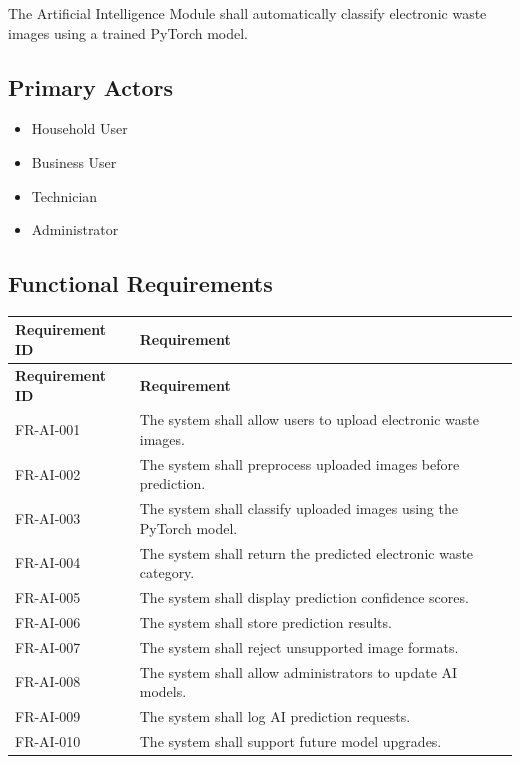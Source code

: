 The Artificial Intelligence Module shall automatically classify
electronic waste images using a trained PyTorch model.

\subsection{Primary Actors}

\begin{itemize}
\item Household User
\item Business User
\item Technician
\item Administrator
\end{itemize}

\subsection{Functional Requirements}

\begin{longtable}{|p{3cm}|p{10.2cm}|}

\hline
\textbf{Requirement ID} &
\textbf{Requirement}\\
\hline
\endfirsthead

\hline
\textbf{Requirement ID} &
\textbf{Requirement}\\
\hline
\endhead

FR-AI-001 &
The system shall allow users to upload electronic waste images.\\
\hline

FR-AI-002 &
The system shall preprocess uploaded images before prediction.\\
\hline

FR-AI-003 &
The system shall classify uploaded images using the PyTorch model.\\
\hline

FR-AI-004 &
The system shall return the predicted electronic waste category.\\
\hline

FR-AI-005 &
The system shall display prediction confidence scores.\\
\hline

FR-AI-006 &
The system shall store prediction results.\\
\hline

FR-AI-007 &
The system shall reject unsupported image formats.\\
\hline

FR-AI-008 &
The system shall allow administrators to update AI models.\\
\hline

FR-AI-009 &
The system shall log AI prediction requests.\\
\hline

FR-AI-010 &
The system shall support future model upgrades.\\
\hline

\end{longtable}

